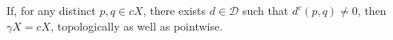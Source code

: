 If, for any distinct $p, q \in cX$, there exists $d \in \mathcal{D}$ such that $d^c(p, q) \neq 0$, then $\gamma X = cX$, topologically as well as pointwise.
